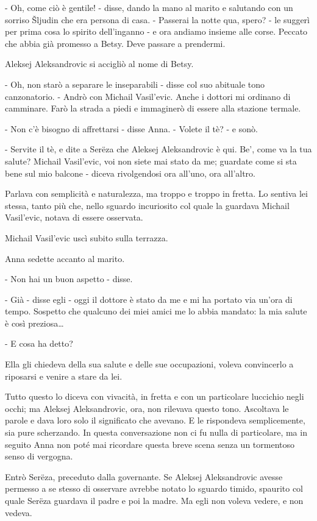 - Oh, come ciò è gentile! - disse, dando la mano al marito e salutando con un sorriso Šljudin che era persona di casa. - Passerai la notte qua, spero? - le suggerì per prima cosa lo spirito dell'inganno - e ora andiamo insieme alle corse. Peccato che abbia già promesso a Betsy. Deve passare a prendermi. 

Aleksej Aleksandrovic si accigliò al nome di Betsy. 

- Oh, non starò a separare le inseparabili - disse col suo abituale tono canzonatorio. - Andrò con Michail Vasil'evic. Anche i dottori mi ordinano di camminare. Farò la strada a piedi e immaginerò di essere alla stazione termale. 

- Non c'è bisogno di affrettarsi - disse Anna. - Volete il tè? - e sonò. 

- Servite il tè, e dite a Serëza che Aleksej Aleksandrovic è qui. Be', come va la tua salute? Michail Vasil'evic, voi non siete mai stato da me; guardate come si sta bene sul mio balcone - diceva rivolgendosi ora all'uno, ora all'altro. 

Parlava con semplicità e naturalezza, ma troppo e troppo in fretta. Lo sentiva lei stessa, tanto più che, nello sguardo incuriosito col quale la guardava Michail Vasil'evic, notava di essere osservata. 

Michail Vasil'evic uscì subito sulla terrazza. 

Anna sedette accanto al marito. 

- Non hai un buon aspetto - disse. 

- Già - disse egli - oggi il dottore è stato da me e mi ha portato via un'ora di tempo. Sospetto che qualcuno dei miei amici me lo abbia mandato: la mia salute è così preziosa\ldots{} 

- E cosa ha detto? 

Ella gli chiedeva della sua salute e delle sue occupazioni, voleva convincerlo a riposarsi e venire a stare da lei. 

Tutto questo lo diceva con vivacità, in fretta e con un particolare luccichio negli occhi; ma Aleksej Aleksandrovic, ora, non rilevava questo tono. Ascoltava le parole e dava loro solo il significato che avevano. E le rispondeva semplicemente, sia pure scherzando. In questa conversazione non ci fu nulla di particolare, ma in seguito Anna non poté mai ricordare questa breve scena senza un tormentoso senso di vergogna. 

Entrò Serëza, preceduto dalla governante. Se Aleksej Aleksandrovic avesse permesso a se stesso di osservare avrebbe notato lo sguardo timido, spaurito col quale Serëza guardava il padre e poi la madre. Ma egli non voleva vedere, e non vedeva. 

